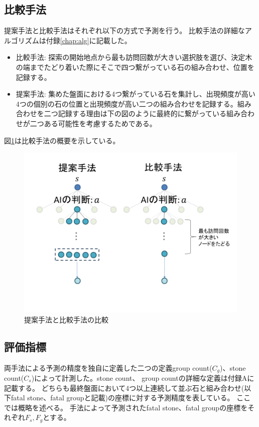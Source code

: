 \subsection{比較手法}
提案手法と比較手法はそれぞれ以下の方式で予測を行う。
比較手法の詳細なアルゴリズムは付録\ref{chap:alg}に記載した。
\begin{itemize}
	\item 比較手法: 探索の開始地点から最も訪問回数が大きい選択肢を選び、決定木の端までたどり着いた際にそこで四つ繋がっている石の組み合わせ、位置を記録する。
	\item 提案手法: 集めた盤面における4つ繋がっている石を集計し、出現頻度が高い4つの個別の石の位置と出現頻度が高い二つの組み合わせを記録する。組み合わせを二つ記録する理由は下の図のように最終的に繋がっている組み合わせが二つある可能性を考慮するためである。
\end{itemize}
図\ref{fig:compare}は比較手法の概要を示している。
\begin{figure}[t]
	\centering
	\includegraphics[width=\linewidth]{./figure/compare.png}
	\caption{提案手法と比較手法の比較}
	\label{fig:compare}
\end{figure}

\subsection{評価指標}
両手法による予測の精度を独自に定義した二つの定義group count($C_g$)、stone count($C_s$)によって計測した。stone count、 group countの詳細な定義は付録Aに記載する。
どちらも最終盤面において4つ以上連続して並ぶ石と組み合わせ(以下fatal stone、fatal groupと記載)の座標に対する予測精度を表している。
ここでは概略を述べる。
手法によって予測されたfatal stone、fatal groupの座標をそれぞれ$F_s, F_g$とする。

